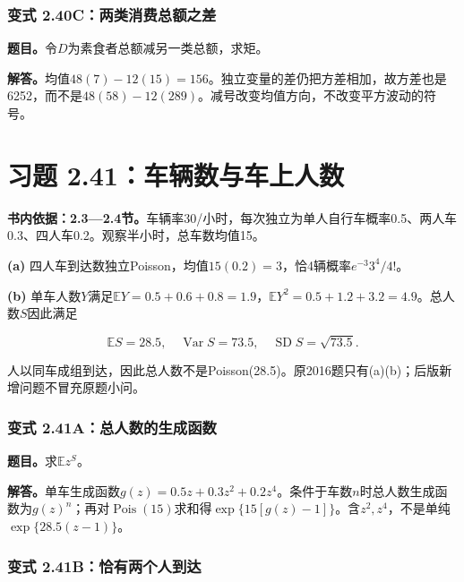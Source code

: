 \documentclass[12pt,a4paper,UTF8,fontset=fandol]{ctexart}
\begin{document}
\subsubsection{变式
2.40C：两类消费总额之差}\label{ux53d8ux5f0f-2.40cux4e24ux7c7bux6d88ux8d39ux603bux989dux4e4bux5dee}

\textbf{题目。}令\(D\)为素食者总额减另一类总额，求矩。

\textbf{解答。}均值\(48(7)-12(15)=156\)。独立变量的差仍把方差相加，故方差也是6252，而不是\(48(58)-12(289)\)。减号改变均值方向，不改变平方波动的符号。

\section{习题
2.41：车辆数与车上人数}\label{ux4e60ux9898-2.41ux8f66ux8f86ux6570ux4e0eux8f66ux4e0aux4ebaux6570}

\textbf{书内依据：2.3---2.4节。}车辆率30/小时，每次独立为单人自行车概率0.5、两人车0.3、四人车0.2。观察半小时，总车数均值15。

\textbf{(a)}
四人车到达数独立Poisson，均值\(15(0.2)=3\)，恰4辆概率\(\boxed{e^{-3}3^4/4!}\)。

\textbf{(b)}
单车人数\(Y\)满足\(\mathbb EY=0.5+0.6+0.8=1.9\)，\(\mathbb EY^2=0.5+1.2+3.2=4.9\)。总人数\(S\)因此满足

\[\boxed{\mathbb ES=28.5,\quad\operatorname{Var}S=73.5,\quad
\operatorname{SD}S=\sqrt{73.5}.}\]

人以同车成组到达，因此总人数不是Poisson(28.5)。原2016题只有(a)(b)；后版新增问题不冒充原题小问。

\subsubsection{变式
2.41A：总人数的生成函数}\label{ux53d8ux5f0f-2.41aux603bux4ebaux6570ux7684ux751fux6210ux51fdux6570}

\textbf{题目。}求\(\mathbb Ez^S\)。

\textbf{解答。}单车生成函数\(g(z)=0.5z+0.3z^2+0.2z^4\)。条件于车数\(n\)时总人数生成函数为\(g(z)^n\)；再对\(\operatorname{Pois}(15)\)求和得\(\exp\{15[g(z)-1]\}\)。含\(z^2,z^4\)，不是单纯\(\exp\{28.5(z-1)\}\)。

\subsubsection{变式
2.41B：恰有两个人到达}\label{ux53d8ux5f0f-2.41bux6070ux6709ux4e24ux4e2aux4ebaux5230ux8fbe}
\end{document}
